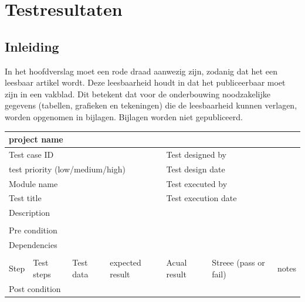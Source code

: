 		
		\chapter{Testresultaten}
		
		\section{Inleiding}
		In het hoofdverslag moet een rode draad aanwezig zijn,
		zodanig dat het een leesbaar artikel wordt. Deze leesbaarheid houdt in
		dat het publiceerbaar moet zijn in een vakblad. Dit betekent dat voor
		de onderbouwing noodzakelijke gegevens (tabellen, grafieken en
		tekeningen) die de leesbaarheid kunnen verlagen, worden opgenomen in
		bijlagen. Bijlagen worden niet gepubliceerd.
		
		
		
			
			\begin{tabular}{|l|l|l|l|l|l|l|} \hline
				\multicolumn{7}{|l|}{project name}                                                               \\ \hline
				\multicolumn{4}{|l|}{Test case ID}   &\multicolumn{3}{|l|}{Test designed by}                           \\ \hline
				\multicolumn{4}{|l|}{test priority (low/medium/high)}   &\multicolumn{3}{|l|}{Test design date}                           \\ \hline
				\multicolumn{4}{|l|}{Module name}   &\multicolumn{3}{|l|}{Test executed by}                           \\ \hline
				\multicolumn{4}{|l|}{Test title}   &\multicolumn{3}{|l|}{Test execution date}                           \\ \hline
				\multicolumn{4}{|l|}{Description}   &\multicolumn{3}{|l|}{ }                           \\ \hline 		
				\multicolumn{7}{|l|}{ }   																\\ \hline
				\multicolumn{7}{|l|}{Pre condition}                                                               \\ \hline
				\multicolumn{7}{|l|}{Dependencies}                                                               \\ \hline
				\multicolumn{7}{|l|}{ }   															\\ \hline
				Step  &  Test steps & Test data & expected result &Acual result &Streee (pass or fail)&notes  \\ \hline
				\multicolumn{7}{|l|}{Post condition}                                                               \\ \hline
			\end{tabular}
			

